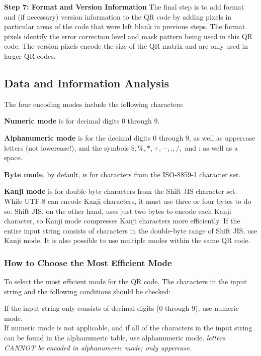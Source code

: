 \textbf{Step 7: Format and Version Information}
The final step is to add format and (if necessary) version information to the QR code by adding pixels in particular areas of the code that were left blank in previous steps. The format pixels identify the error correction level and mask pattern being used in this QR code. The version pixels encode the size of the QR matrix and are only used in larger QR codes.\\

\subsection{Data and Information Analysis}
The four encoding modes include the following characters:

\textbf{Numeric mode} is for decimal digits 0 through 9.

\textbf{Alphanumeric mode} is for the decimal digits 0 through 9, as well as uppercase letters (not lowercase!), and the symbols $\$, \%, *, +, -, ., /,$ and : as well as a space.

\textbf{Byte mode}, by default, is for characters from the ISO-8859-1 character set.

\textbf{Kanji mode} is for double-byte characters from the Shift JIS character set. While UTF-8 can encode Kanji characters, it must use three or four bytes to do so. Shift JIS, on the other hand, uses just two bytes to encode each Kanji character, so Kanji mode compresses Kanji characters more efficiently. If the entire input string consists of characters in the double-byte range of Shift JIS, use Kanji mode. It is also possible to use multiple modes within the same QR code.

\subsubsection{How to Choose the Most Efficient Mode}

To select the most efficient mode for the QR code, The characters in the input string and the following conditions should be checked:

If the input string only consists of decimal digits (0 through 9), use numeric mode.\\

If numeric mode is not applicable, and if all of the characters in the input string can be found in the alphanumeric table, use alphanumeric mode. \emph{letters CANNOT be encoded in alphanumeric mode; only uppercase.}\\

